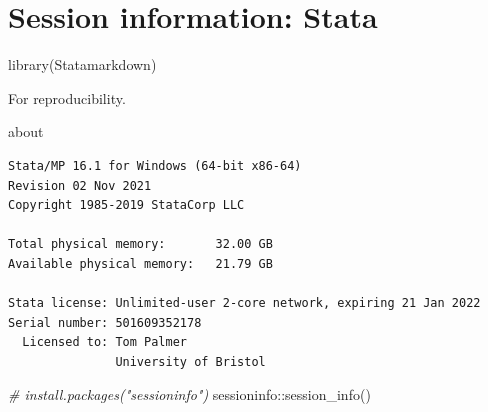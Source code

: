 \documentclass[
  10pt,
]{book}
\newenvironment{Shaded}{\begin{snugshade}}{\end{snugshade}}
\newcommand{\CommentTok}[1]{\textcolor[rgb]{0.56,0.35,0.01}{\textit{#1}}}
\newcommand{\FunctionTok}[1]{\textcolor[rgb]{0.00,0.00,0.00}{#1}}
\newcommand{\NormalTok}[1]{#1}
\newcommand{\SpecialCharTok}[1]{\textcolor[rgb]{0.00,0.00,0.00}{#1}}
\begin{document}
\hypertarget{session-information-stata}{%
\chapter*{Session information: Stata}\label{session-information-stata}}

\begin{Shaded}
\begin{Highlighting}[]
\FunctionTok{library}\NormalTok{(Statamarkdown)}
\end{Highlighting}
\end{Shaded}

For reproducibility.

\begin{Shaded}
\begin{Highlighting}[]
\NormalTok{about}
\end{Highlighting}
\end{Shaded}

\begin{verbatim}
Stata/MP 16.1 for Windows (64-bit x86-64)
Revision 02 Nov 2021
Copyright 1985-2019 StataCorp LLC

Total physical memory:       32.00 GB
Available physical memory:   21.79 GB

Stata license: Unlimited-user 2-core network, expiring 21 Jan 2022
Serial number: 501609352178
  Licensed to: Tom Palmer
               University of Bristol
\end{verbatim}

\begin{Shaded}
\begin{Highlighting}[]
\CommentTok{\# install.packages("sessioninfo")}
\NormalTok{sessioninfo}\SpecialCharTok{::}\FunctionTok{session\_info}\NormalTok{()}
\end{Highlighting}
\end{Shaded}
\end{document}
